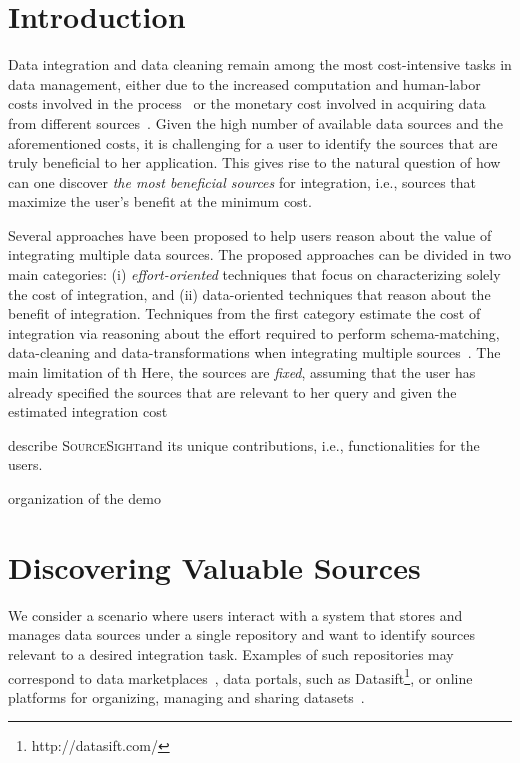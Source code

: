 \documentclass{vldb}
\newcommand\system{\textsc{SourceSight}}
\begin{document}
\section{Introduction}
Data integration and data cleaning remain among the most cost-intensive tasks in data management, either due to the increased computation and human-labor costs involved in the process~\cite{kruse2015estimating} or the monetary cost involved in acquiring data from different sources~\cite{balazinska:vldb11}. Given the high number of available data sources and the aforementioned costs, it is challenging for a user to identify the sources that are truly beneficial to her application. This gives rise to the natural question of how can one discover {\em the most beneficial sources} for integration, i.e., sources that maximize the user's benefit at the minimum cost. 

Several approaches have been proposed to help users reason about the value of integrating multiple data sources. The proposed approaches can be divided in two main categories: (i) {\em effort-oriented} techniques that focus on characterizing solely the cost of integration, and (ii) data-oriented techniques that reason about the benefit of integration. Techniques from the first category estimate the cost of integration via reasoning about the effort required to perform schema-matching, data-cleaning and data-transformations when integrating multiple sources~\cite{kruse2015estimating, smith:2009}. The main limitation of th Here, the sources are {\em fixed}, assuming that the user has already specified the sources that are relevant to her query and given the estimated integration cost 

describe \system and its unique contributions, i.e., functionalities for the users.

organization of the demo


\section{Discovering Valuable Sources}
We consider a scenario where users interact with a system that stores and manages data sources under a single repository and want to identify sources relevant to a desired integration task. Examples of such repositories may correspond to data marketplaces~\cite{balazinska:vldb11}, data portals, such as Datasift\footnote{http://datasift.com/}, or online platforms for organizing, managing and sharing datasets~\cite{datahub}. 
\end{document}

